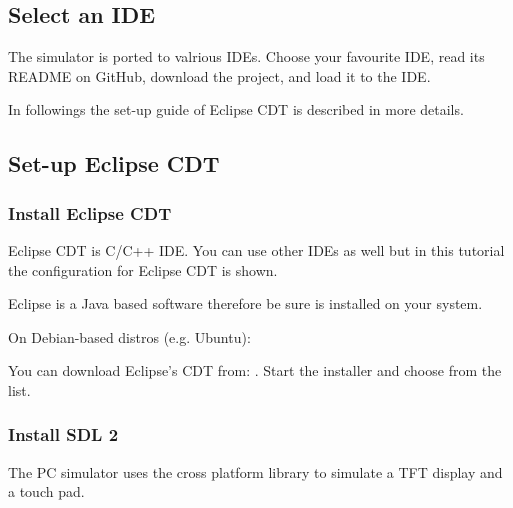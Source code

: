 \documentclass[letterpaper,10pt,english]{sphinxmanual}
\begin{document}
\subsection{Select an IDE}
\label{\detokenize{get-started/pc-simulator:select-an-ide}}
The simulator is ported to valrious IDEs. Choose your favourite IDE, read its README on GitHub, download the project, and load it to the IDE.



In followings the set-up guide of Eclipse CDT is described in more details.


\subsection{Set-up Eclipse CDT}
\label{\detokenize{get-started/pc-simulator:set-up-eclipse-cdt}}

\subsubsection{Install Eclipse CDT}
\label{\detokenize{get-started/pc-simulator:install-eclipse-cdt}}
Eclipse CDT is C/C++ IDE. You can use other IDEs as well but in this tutorial the configuration for Eclipse CDT is shown.

Eclipse is a Java based software therefore be sure  is installed on your system.

On Debian-based distros (e.g. Ubuntu): 

You can download Eclipse’s CDT from: . Start the installer and choose  from the list.


\subsubsection{Install SDL 2}
\label{\detokenize{get-started/pc-simulator:install-sdl-2}}
The PC simulator uses the  cross platform library to simulate a TFT display and a touch pad.
\end{document}
